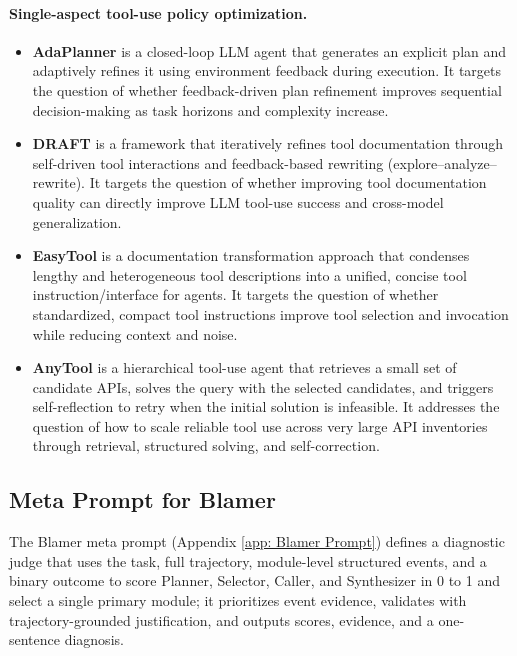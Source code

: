 \documentclass[11pt]{article}
\begin{document}
\paragraph{Single-aspect tool-use policy optimization.}
\begin{itemize}
  \item \textbf{AdaPlanner} \cite{sun2023adaplanner} is a closed-loop LLM agent that generates an explicit plan and adaptively refines it using environment feedback during execution. It targets the question of whether feedback-driven plan refinement improves sequential decision-making as task horizons and complexity increase.

  \item \textbf{DRAFT} \cite{qu2024exploration} is a framework that iteratively refines tool documentation through self-driven tool interactions and feedback-based rewriting (explore--analyze--rewrite). It targets the question of whether improving tool documentation quality can directly improve LLM tool-use success and cross-model generalization.

  \item \textbf{EasyTool} \cite{yuan2025easytool} is a documentation transformation approach that condenses lengthy and heterogeneous tool descriptions into a unified, concise tool instruction/interface for agents. It targets the question of whether standardized, compact tool instructions improve tool selection and invocation while reducing context and noise.

  \item \textbf{AnyTool} \cite{du2024anytool} is a hierarchical tool-use agent that retrieves a small set of candidate APIs, solves the query with the selected candidates, and triggers self-reflection to retry when the initial solution is infeasible. It addresses the question of how to scale reliable tool use across very large API inventories through retrieval, structured solving, and self-correction.
\end{itemize}




\subsection{Meta Prompt for Blamer}

The Blamer meta prompt (Appendix \ref{app: Blamer Prompt}) defines a diagnostic judge that uses the task, full trajectory, module-level structured events, and a binary outcome to score Planner, Selector, Caller, and Synthesizer in 0 to 1 and select a single primary module; it prioritizes event evidence, validates with trajectory-grounded justification, and outputs scores, evidence, and a one-sentence diagnosis.
\end{document}
